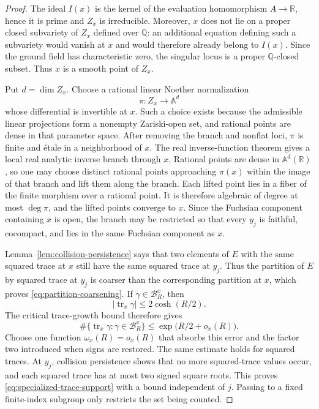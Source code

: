 \documentclass[11pt,reqno]{amsart}
\theoremstyle{definition}
\theoremstyle{remark}
\newcommand{\R}{\mathbb R}
\newcommand{\Q}{\mathbb Q}
\newcommand{\cB}{\mathcal B}
\newcommand{\Tr}{\operatorname{tr}}
\begin{document}
\begin{proof}
The ideal \(I(x)\) is the kernel of the evaluation homomorphism
\(A\to\R\), hence it is prime and \(Z_x\) is irreducible.  Moreover, \(x\)
does not lie on a proper closed subvariety of \(Z_x\) defined over \(\Q\):
an additional equation defining such a subvariety would vanish at \(x\) and
would therefore already belong to \(I(x)\).  Since the ground field has
characteristic zero, the singular locus is a proper \(\Q\)-closed subset.
Thus \(x\) is a smooth point of \(Z_x\).

Put \(d=\dim Z_x\).  Choose a rational linear Noether normalization
\[
 \pi:Z_x\longrightarrow\mathbb A^d
\]
whose differential is invertible at \(x\).  Such a choice exists because
the admissible linear projections form a nonempty Zariski-open set, and
rational points are dense in that parameter space.  After removing the
branch and nonflat loci, \(\pi\) is finite and \'etale in a neighborhood of
\(x\).  The real inverse-function theorem gives a local real analytic
inverse branch through \(x\).  Rational points are dense in
\(\mathbb A^d(\R)\), so one may choose distinct rational points approaching
\(\pi(x)\) within the image of that branch and lift them along the branch.
Each lifted point lies in a fiber of the finite morphism over a rational
point.  It is therefore algebraic of degree at most \(\deg\pi\), and the
lifted points converge to \(x\).  Since the Fuchsian component containing
\(x\) is open, the branch may be restricted so that every \(y_j\) is
faithful, cocompact, and lies in the same Fuchsian component as \(x\).

Lemma~\ref{lem:collision-persistence} says that two elements of \(E\) with
the same squared trace at \(x\) still have the same squared trace at
\(y_j\).  Thus the partition of \(E\) by squared trace at \(y_j\) is
coarser than the corresponding partition at \(x\), which proves
\eqref{eq:partition-coarsening}.  If
\(\gamma\in\cB_R^x\), then
\[
 |\Tr_x\gamma|\le 2\cosh(R/2).
\]
The critical trace-growth bound therefore gives
\[
 \#\{\Tr_x\gamma:\gamma\in\cB_R^x\}
 \le \exp\bigl(R/2+o_x(R)\bigr).
\]
Choose one function \(\omega_x(R)=o_x(R)\) that absorbs this error and the
factor two introduced when signs are restored.  The same estimate holds
for squared traces.
At \(y_j\), collision persistence shows that no more squared-trace values
occur, and each squared trace has at most two signed square roots.  This
proves \eqref{eq:specialized-trace-support} with a bound independent of
\(j\).  Passing to a fixed finite-index subgroup only restricts the set
being counted.
\end{proof}
\end{document}
